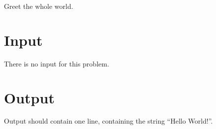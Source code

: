 
Greet the whole world.

\section*{Input}

There is no input for this problem.

\section*{Output}

Output should contain one line, containing the string “Hello World!”.

